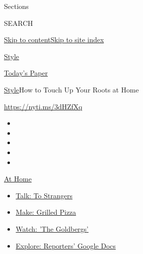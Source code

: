 Sections

SEARCH

\protect\hyperlink{site-content}{Skip to
content}\protect\hyperlink{site-index}{Skip to site index}

\href{https://www.nytimes3xbfgragh.onion/section/style}{Style}

\href{https://myaccount.nytimes3xbfgragh.onion/auth/login?response_type=cookie\&client_id=vi}{}

\href{https://www.nytimes3xbfgragh.onion/section/todayspaper}{Today's
Paper}

\href{/section/style}{Style}\textbar{}How to Touch Up Your Roots at Home

\href{https://nyti.ms/3dHZfXq}{https://nyti.ms/3dHZfXq}

\begin{itemize}
\item
\item
\item
\item
\item
\end{itemize}

\href{https://www.nytimes3xbfgragh.onion/spotlight/at-home?action=click\&pgtype=Article\&state=default\&region=TOP_BANNER\&context=at_home_menu}{At
Home}

\begin{itemize}
\tightlist
\item
  \href{https://www.nytimes3xbfgragh.onion/2020/08/03/well/family/the-benefits-of-talking-to-strangers.html?action=click\&pgtype=Article\&state=default\&region=TOP_BANNER\&context=at_home_menu}{Talk:
  To Strangers}
\item
  \href{https://www.nytimes3xbfgragh.onion/2020/08/01/at-home/coronavirus-make-pizza-on-a-grill.html?action=click\&pgtype=Article\&state=default\&region=TOP_BANNER\&context=at_home_menu}{Make:
  Grilled Pizza}
\item
  \href{https://www.nytimes3xbfgragh.onion/2020/07/31/arts/television/goldbergs-abc-stream.html?action=click\&pgtype=Article\&state=default\&region=TOP_BANNER\&context=at_home_menu}{Watch:
  'The Goldbergs'}
\item
  \href{https://www.nytimes3xbfgragh.onion/interactive/2020/at-home/even-more-reporters-editors-diaries-lists-recommendations.html?action=click\&pgtype=Article\&state=default\&region=TOP_BANNER\&context=at_home_menu}{Explore:
  Reporters' Google Docs}
\end{itemize}

